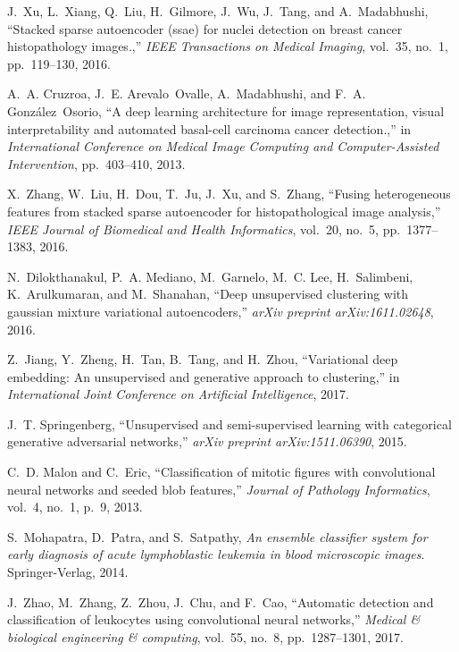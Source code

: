 \documentclass[journal]{IEEEtran}
\begin{document}
\begin{thebibliography}{10}
J.~Xu, L.~Xiang, Q.~Liu, H.~Gilmore, J.~Wu, J.~Tang, and A.~Madabhushi,
  ``Stacked sparse autoencoder (ssae) for nuclei detection on breast cancer
  histopathology images.,'' {\em IEEE Transactions on Medical Imaging},
  vol.~35, no.~1, pp.~119--130, 2016.

A.~A. Cruzroa, J.~E. Arevalo~Ovalle, A.~Madabhushi, and F.~A. González~Osorio,
  ``A deep learning architecture for image representation, visual
  interpretability and automated basal-cell carcinoma cancer detection.,'' in
  {\em International Conference on Medical Image Computing and
  Computer-Assisted Intervention}, pp.~403--410, 2013.

X.~Zhang, W.~Liu, H.~Dou, T.~Ju, J.~Xu, and S.~Zhang, ``Fusing heterogeneous features from stacked sparse autoencoder for histopathological image analysis,''{\em
    IEEE Journal of Biomedical and Health Informatics}, vol.~20, no.~5, pp.~1377--1383, 2016.

N.~Dilokthanakul, P.~A. Mediano, M.~Garnelo, M.~C. Lee, H.~Salimbeni,
  K.~Arulkumaran, and M.~Shanahan, ``Deep unsupervised clustering with gaussian
  mixture variational autoencoders,'' {\em arXiv preprint arXiv:1611.02648},
  2016.

Z.~Jiang, Y.~Zheng, H.~Tan, B.~Tang, and H.~Zhou, ``Variational deep embedding:
  An unsupervised and generative approach to clustering,'' in {\em
  International Joint Conference on Artificial Intelligence}, 2017.

J.~T. Springenberg, ``Unsupervised and semi-supervised learning with
  categorical generative adversarial networks,'' {\em arXiv preprint
  arXiv:1511.06390}, 2015.

C.~D. Malon and C.~Eric, ``Classification of mitotic figures with convolutional
  neural networks and seeded blob features,'' {\em Journal of Pathology
  Informatics}, vol.~4, no.~1, p.~9, 2013.

S.~Mohapatra, D.~Patra, and S.~Satpathy, {\em An ensemble classifier system for
  early diagnosis of acute lymphoblastic leukemia in blood microscopic images}.
\newblock Springer-Verlag, 2014.

J.~Zhao, M.~Zhang, Z.~Zhou, J.~Chu, and F.~Cao, ``Automatic detection and
  classification of leukocytes using convolutional neural networks,'' {\em
  Medical \& biological engineering \& computing}, vol.~55, no.~8,
  pp.~1287--1301, 2017.


\end{thebibliography}
\end{document}
